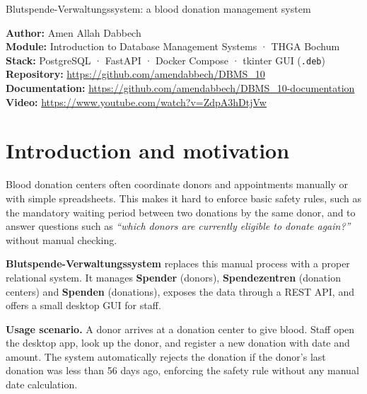\documentclass[11pt,a4paper]{article}
\begin{document}
\thispagestyle{empty}
%
{Blutspende-Verwaltungssystem: a blood donation management system}

\begin{infobox}
\textbf{Author:} Amen Allah Dabbech \\
\textbf{Module:} Introduction to Database Management Systems · THGA Bochum \\
\textbf{Stack:} PostgreSQL · FastAPI · Docker Compose · tkinter GUI (\texttt{.deb}) \\
\textbf{Repository:} \url{https://github.com/amendabbech/DBMS_10} \\
\textbf{Documentation:} \url{https://github.com/amendabbech/DBMS_10-documentation} \\
\textbf{Video:} \url{https://www.youtube.com/watch?v=ZdpA3hDtjVw}
\end{infobox}

\tableofcontents
\vspace{1em}

\section{Introduction and motivation}

Blood donation centers often coordinate donors and appointments manually or
with simple spreadsheets. This makes it hard to enforce basic safety rules,
such as the mandatory waiting period between two donations by the same donor,
and to answer questions such as \emph{``which donors are currently eligible to
donate again?''} without manual checking.

\textbf{Blutspende-Verwaltungssystem} replaces this manual process with a
proper relational system. It manages \textbf{Spender} (donors),
\textbf{Spendezentren} (donation centers) and \textbf{Spenden} (donations),
exposes the data through a REST API, and offers a small desktop GUI for
staff.

\begin{beispielbox}
\textbf{Usage scenario.} A donor arrives at a donation center to give blood.
Staff open the desktop app, look up the donor, and register a new donation
with date and amount. The system automatically rejects the donation if the
donor's last donation was less than 56 days ago, enforcing the safety rule
without any manual date calculation.
\end{beispielbox}
\end{document}
